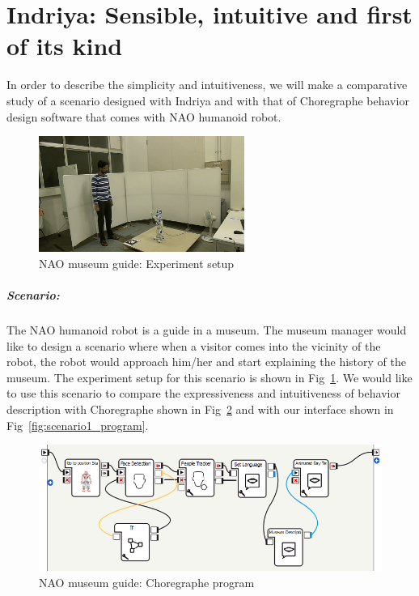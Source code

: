 \section{Indriya: Sensible, intuitive and first of its kind}
In order to describe the simplicity and intuitiveness, we will make a comparative study of a scenario designed with Indriya and with that of Choregraphe behavior design software that comes with NAO humanoid robot. 
\begin{figure}[H]
\centering
\includegraphics[width=0.6\textwidth]{../thesis/assets/scenario_museum.png}
\caption[NAO museum guide: Experiment setup]{NAO museum guide: Experiment setup}
\label{fig:scenario1_setup}
\end{figure}
\subparagraph{Scenario:}The NAO humanoid robot is a guide in a museum. The museum manager would like to design a scenario where when a visitor comes into the vicinity of the robot, the robot would approach him/her and start explaining the history of the museum. The experiment setup for this scenario is shown in Fig~\ref{fig:scenario1_setup}. We would like to use this scenario to compare the expressiveness and intuitiveness of behavior description with Choregraphe \cite{NaoRobot} shown in Fig~\ref{fig:scenario1_program_choregraphe} and with our interface shown in Fig~\ref{fig:scenario1_program}.
\begin{figure}[H]
\centering
\includegraphics[width=\textwidth]{../thesis/assets/scenario_museum_choregraphe3.png}
\caption[NAO museum guide: Choregraphe program]{NAO museum guide: Choregraphe program}
\label{fig:scenario1_program_choregraphe}
\end{figure}
